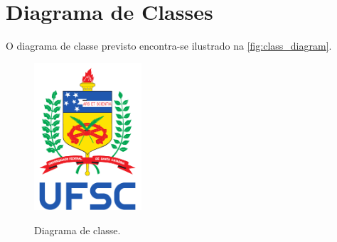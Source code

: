 %
%
%
%
%

%
%
%
%
%

\section{Diagrama de Classes} \label{sec:class_diagrams}

O diagrama de classe previsto encontra-se ilustrado na \autoref{fig:class_diagram}.

\begin{figure}[!ht]
    \begin{center}
        \includegraphics[width=4cm]{figures/ufsc.pdf}
        \label{fig:class_diagram}
        \caption{Diagrama de classe.}
    \end{center}
\end{figure}
